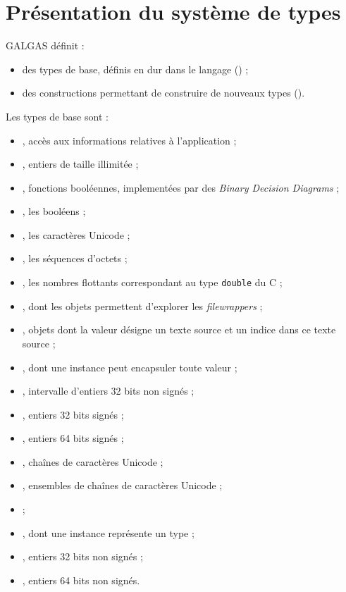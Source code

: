 
\chapter{Présentation du système de types}



GALGAS définit :
\begin{itemize}
\item des types de base, définis en dur dans le langage () ;
\item des constructions permettant de construire de nouveaux types ().
\end{itemize}





Les types de base sont :
\begin{itemize}
\item {}, accès aux informations relatives à l'application ;
\item {}, entiers de taille illimitée ;
\item {}, fonctions booléennes, implementées par des \emph{Binary Decision Diagrams} ;
\item {}, les booléens ;
\item {}, les caractères Unicode ;
\item {}, les séquences d'octets ;
\item {}, les nombres flottants correspondant au type \texttt{double} du C ;
\item {}, dont les objets permettent d'explorer les \emph{filewrappers} ;
\item {}, objets dont la valeur désigne un texte source et un indice dans ce texte source ;
\item {}, dont une instance peut encapsuler toute valeur ;
\item {}, intervalle d'entiers 32 bits non signés ;
\item {}, entiers 32 bits signés ;
\item {}, entiers 64 bits signés ;
\item {}, chaînes de caractères Unicode ;
\item {}, ensembles de chaînes de caractères Unicode ;
\item {} ;
\item {}, dont une instance représente un type ;
\item {}, entiers 32 bits non signés ;
\item {}, entiers 64 bits non signés.
\end{itemize}





